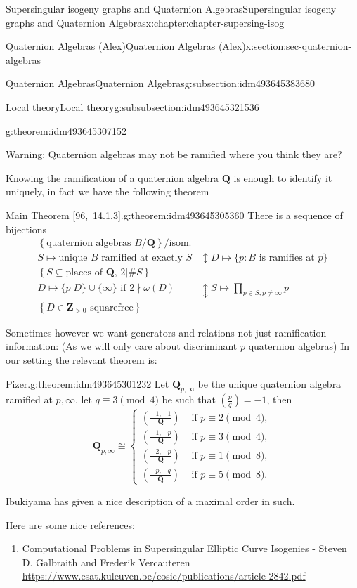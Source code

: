 \documentclass[oneside,10pt,]{book}
\numberwithin{equation}{section}
\newcommand{\legendre}[2]{\left(\frac{#1}{#2}\right)}
\newcommand{\ZZ}{\mathbf{Z}}
\newcommand{\QQ}{\mathbf{Q}}
\newcommand{\gt}{>}
\newcommand{\amp}{&}
\begin{document}
\begin{chapterptx}{Supersingular isogeny graphs and Quaternion Algebras}{}{Supersingular isogeny graphs and Quaternion Algebras}{}{}{x:chapter:chapter-supersing-isog}
\begin{sectionptx}{Quaternion Algebras (Alex)}{}{Quaternion Algebras (Alex)}{}{}{x:section:sec-quaternion-algebras}
\begin{subsectionptx}{Quaternion Algebras}{}{Quaternion Algebras}{}{}{g:subsection:idm493645383680}
\begin{subsubsectionptx}{Local theory}{}{Local theory}{}{}{g:subsubsection:idm493645321536}
\begin{theorem}{}{}{g:theorem:idm493645307152}
\end{theorem}
Warning: Quaternion algebras may not be ramified where you think they are?%
\par
Knowing the ramification of a quaternion algebra \(\QQ\) is enough to identify it uniquely, in fact we have the following theorem%
\begin{theorem}{Main Theorem [96,~14.1.3].}{}{g:theorem:idm493645305360}%
There is a sequence of bijections%
\begin{align*}
\left\{ \text{quaternion algebras }B/\QQ \right\}/\text{isom.}\\
S \mapsto \text{unique }B \text{ ramified at exactly }S\amp\updownarrow D\mapsto \{p : B \text{ is ramifies at } p\}\\
\left\{ S \subseteq \text{places of }\QQ,\,2|\#S \right\}\\
D \mapsto \{p|D\} \cup \{\infty\} \text{ if }2\nmid \omega(D)\amp\updownarrow S \mapsto \prod_{p\in S,p\ne \infty} p\\
\left\{ D\in \ZZ_{\gt 0 }\text{ squarefree}\right\}
\end{align*}
%
\end{theorem}
Sometimes however we want generators and relations not just ramification information: (As we will only care about discriminant \(p\) quaternion algebras) In our setting the relevant theorem is:%
\begin{theorem}{Pizer.}{}{g:theorem:idm493645301232}%
Let \(\QQ_{p,\infty}\) be the unique quaternion algebra ramified at \(p,\infty\), let \(q \equiv 3 \pmod 4\) be such that \(\legendre pq = -1\), then%
\begin{equation*}
\QQ_{p,\infty} \cong
\begin{cases}
\legendre{-1,-1}{\QQ} \amp \text{ if }p\equiv 2\pmod 4,\\
\legendre{-1,-p}{\QQ} \amp \text{ if }p\equiv 3\pmod 4,\\
\legendre{-2,-p}{\QQ} \amp \text{ if }p\equiv 1\pmod 8,\\
\legendre{-p,-q}{\QQ} \amp \text{ if }p\equiv 5\pmod 8.
\end{cases}
\end{equation*}
%
\end{theorem}
Ibukiyama has given a nice description of a maximal order in such.%
\par
Here are some nice references:%
\begin{enumerate}
\item{}Computational Problems in Supersingular Elliptic Curve Isogenies - Steven D. Galbraith and Frederik Vercauteren \url{https://www.esat.kuleuven.be/cosic/publications/article-2842.pdf}%

\end{enumerate}
\end{subsubsectionptx}
\end{subsectionptx}
\end{sectionptx}
\end{chapterptx}
\end{document}
